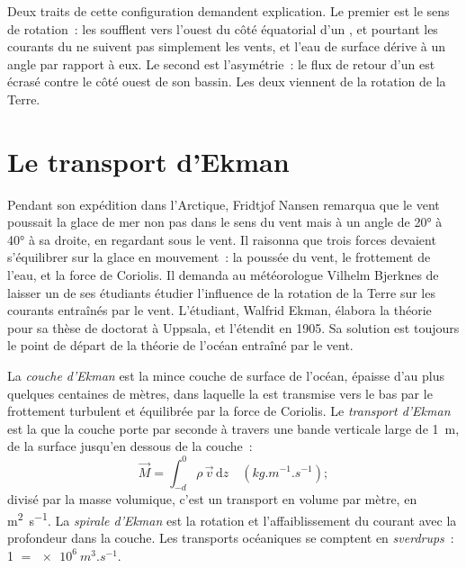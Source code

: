 
Deux traits de cette configuration demandent explication. Le premier est le sens de rotation~:
les  soufflent vers l'ouest du côté équatorial d'un ,
et pourtant les courants du  ne suivent pas simplement les vents, et l'eau de surface
dérive à un angle par rapport à eux. Le second est l'asymétrie~: le flux de retour d'un 
est écrasé contre le côté ouest de son bassin. Les deux viennent de la rotation de
la Terre.

\section{Le transport d'Ekman}\label{sec:b1:ocean-circulation:ekman}

\begin{history}
Pendant son expédition dans l'Arctique, Fridtjof Nansen remarqua que le vent poussait
la glace de mer non pas dans le sens du vent mais à un angle de \ang{20} à \ang{40} à sa
droite, en regardant sous le vent. Il raisonna que trois forces devaient s'équilibrer sur la glace
en mouvement~: la poussée du vent, le frottement de l'eau, et la force de Coriolis. Il
demanda au météorologue Vilhelm Bjerknes de laisser un de ses étudiants étudier
l'influence de la rotation de la Terre sur les courants entraînés par le vent. L'étudiant, Walfrid
Ekman, élabora la théorie pour sa thèse de doctorat à Uppsala, et l'étendit en
1905. Sa solution est toujours le point de départ de la théorie de l'océan
entraîné par le vent.
\end{history}

\begin{definition}\label{def:b1:ocean-circulation:ekman}
La \emph{couche d'Ekman} est la mince couche de surface de l'océan,
épaisse d'au plus quelques centaines de mètres, dans laquelle la  est transmise vers le bas
par le frottement turbulent et équilibrée par la force de Coriolis. Le \emph{transport
d'Ekman} est la  que la couche porte par
seconde à travers une bande verticale large de \qty{1}{m}, de la surface jusqu'en dessous de la
couche~:
\[
  \vec M = \int_{-d}^{0} \rho\,\vec v\,\mathrm dz \quad (\unit{kg.m^{-1}.s^{-1}});
\]
divisé par la masse volumique, c'est un transport en volume par mètre, en
\unit{m^2.s^{-1}}. La \emph{spirale d'Ekman} est la rotation et
l'affaiblissement du courant avec la profondeur dans la couche. Les transports océaniques se comptent en
\emph{sverdrups}~: \qty{1}{\sverdrup} $=
\qty{e6}{m^3.s^{-1}}$.
\end{definition}

